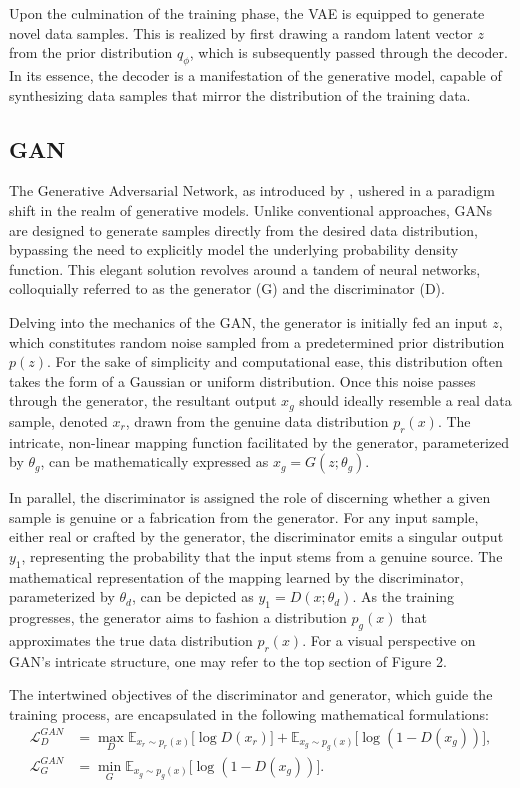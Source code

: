 \documentclass[preprint,12pt,authoryear]{elsarticle}
\begin{document}
Upon the culmination of the training phase, the VAE is equipped to generate novel data samples. This is realized by first drawing a random latent vector \(z\) from the prior distribution \(q_\phi\), which is subsequently passed through the decoder. In its essence, the decoder is a manifestation of the generative model, capable of synthesizing data samples that mirror the distribution of the training data.

\subsection{GAN} 
The Generative Adversarial Network, as introduced by \citep{23_GAN}, ushered in a paradigm shift in the realm of generative models. Unlike conventional approaches, GANs are designed to generate samples directly from the desired data distribution, bypassing the need to explicitly model the underlying probability density function. This elegant solution revolves around a tandem of neural networks, colloquially referred to as the generator (G) and the discriminator (D).

Delving into the mechanics of the GAN, the generator is initially fed an input \(z\), which constitutes random noise sampled from a predetermined prior distribution \(p(z)\). For the sake of simplicity and computational ease, this distribution often takes the form of a Gaussian or uniform distribution. Once this noise passes through the generator, the resultant output \(x_g\) should ideally resemble a real data sample, denoted \(x_r\), drawn from the genuine data distribution \(p_r(x)\). The intricate, non-linear mapping function facilitated by the generator, parameterized by \(\theta_g\), can be mathematically expressed as \(x_g = G(z;\theta_g)\).

In parallel, the discriminator is assigned the role of discerning whether a given sample is genuine or a fabrication from the generator. For any input sample, either real or crafted by the generator, the discriminator emits a singular output \(y_1\), representing the probability that the input stems from a genuine source. The mathematical representation of the mapping learned by the discriminator, parameterized by \(\theta_d\), can be depicted as \(y_1 = D(x;\theta_d)\). As the training progresses, the generator aims to fashion a distribution \(p_g(x)\) that approximates the true data distribution \(p_r(x)\). For a visual perspective on GAN's intricate structure, one may refer to the top section of Figure 2.

The intertwined objectives of the discriminator and generator, which guide the training process, are encapsulated in the following mathematical formulations:
\begin{equation}
\begin{split}
\mathcal{L}^{GAN}_{D} &= \max_{D}  \mathbb{E}_{x_r\sim p_r{(x)}}\big[\log D(x_r) \big] 
 + \mathbb{E}_{x_g\sim p_g(x)}\big[\log(1-D(x_g))\big], \\
\mathcal{L}^{GAN}_{G} &= \min_{G}   \mathbb{E}_{x_g\sim p_g(x)}\big[\log(1-D(x_g))\big].
\end{split}
\end{equation}
\end{document}
